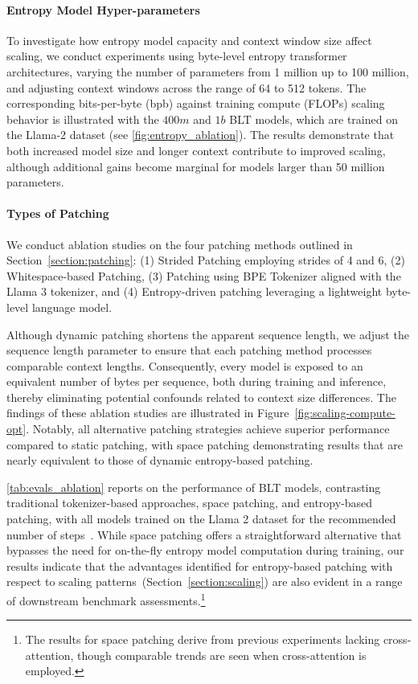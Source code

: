 \paragraph{Entropy Model Hyper-parameters} To investigate how entropy model capacity and context window size affect scaling, we conduct experiments using byte-level entropy transformer architectures, varying the number of parameters from 1 million up to 100 million, and adjusting context windows across the range of 64 to 512 tokens. The corresponding bits-per-byte (bpb) against training compute (FLOPs) scaling behavior is illustrated with the $400m$ and $1b$ {\textsc BLT} models, which are trained on the Llama-2 dataset (see \autoref{fig:entropy_ablation}). The results demonstrate that both increased model size and longer context contribute to improved scaling, although additional gains become marginal for models larger than 50 million parameters.

\paragraph{Types of Patching}

We conduct ablation studies on the four patching methods outlined in Section~\ref{section:patching}: (1) Strided Patching employing strides of 4 and 6, (2) Whitespace-based Patching, (3) Patching using BPE Tokenizer aligned with the Llama 3 tokenizer, and (4) Entropy-driven patching leveraging a lightweight byte-level language model.

Although dynamic patching shortens the apparent sequence length, we adjust the sequence length parameter to ensure that each patching method processes comparable context lengths. Consequently, every model is exposed to an equivalent number of bytes per sequence, both during training and inference, thereby eliminating potential confounds related to context size differences. The findings of these ablation studies are illustrated in Figure~\ref{fig:scaling-compute-opt}. Notably, all alternative patching strategies achieve superior performance compared to static patching, with space patching demonstrating results that are nearly equivalent to those of dynamic entropy-based patching.

\autoref{tab:evals_ablation} reports on the performance of {\textsc BLT} models, contrasting traditional tokenizer-based approaches, space patching, and entropy-based patching, with all models trained on the Llama 2 dataset for the recommended number of steps~\citep{dubey2024llama}. While space patching offers a straightforward alternative that bypasses the need for on-the-fly entropy model computation during training, our results indicate that the advantages identified for entropy-based patching with respect to scaling patterns~(Section~\ref{section:scaling}) are also evident in a range of downstream benchmark assessments.\footnote{The results for space patching derive from previous experiments lacking cross-attention, though comparable trends are seen when cross-attention is employed.}

